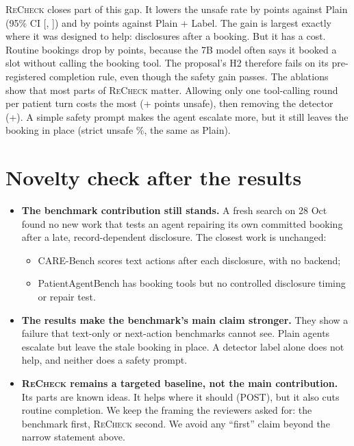 \documentclass[10pt]{article}
\newcommand{\recheck}{\textsc{ReCheck}}
\begin{document}
\recheck{} closes part of this gap. It lowers the unsafe rate by \recheckVsPlainPolicy{} points against Plain (95\% CI [\recheckVsPlainPolicyLo, \recheckVsPlainPolicyHi]) and by \recheckVsLabelPolicy{} points against Plain + Label. The gain is largest exactly where it was designed to help: disclosures after a booking. But it has a cost. Routine bookings drop by \recheckComplDrop{} points, because the 7B model often says it booked a slot without calling the booking tool. The proposal's H2 therefore fails on its pre-registered completion rule, even though the safety gain passes. The ablations show that most parts of \recheck{} matter. Allowing only one tool-calling round per patient turn costs the most (+\ablsinglepassDiff{} points unsafe), then removing the detector (+\ablnodetectorDiff). A simple safety prompt makes the agent escalate more, but it still leaves the booking in place (strict unsafe \safetyStrict\%, the same as Plain).

\section{Novelty check after the results}
\begin{itemize}
\item \textbf{The benchmark contribution still stands.} A fresh search on 28 Oct found no new work that tests an agent repairing its own committed booking after a late, record-dependent disclosure. The closest work is unchanged:
  \begin{itemize}
  \item CARE-Bench scores text actions after each disclosure, with no backend;
  \item PatientAgentBench has booking tools but no controlled disclosure timing or repair test.
  \end{itemize}
\item \textbf{The results make the benchmark's main claim stronger.} They show a failure that text-only or next-action benchmarks cannot see. Plain agents escalate but leave the stale booking in place. A detector label alone does not help, and neither does a safety prompt.
\item \textbf{\recheck{} remains a targeted baseline, not the main contribution.} Its parts are known ideas. It helps where it should (POST), but it also cuts routine completion. We keep the framing the reviewers asked for: the benchmark first, \recheck{} second. We avoid any ``first'' claim beyond the narrow statement above.
\end{itemize}
\end{document}
